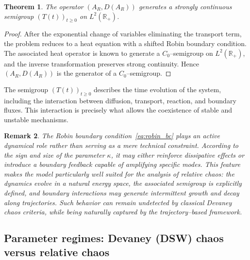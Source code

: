 \documentclass[12pt]{article}
\newtheorem{theorem}{Theorem}[section]
\newtheorem{remark}[theorem]{Remark}
\begin{document}
\begin{theorem}\label{thm:AR_generation}
The operator $(A_R,D(A_R))$ generates a strongly continuous semigroup $(T(t))_{t\ge 0}$ on $L^2(\mathbb{R}_+)$.
\end{theorem}

\begin{proof}
After the exponential change of variables eliminating the transport term, the problem reduces to a heat equation with a shifted Robin boundary condition. The associated heat operator is known to generate a $C_0$--semigroup on $L^2(\mathbb{R}_+)$, and the inverse transformation preserves strong continuity. Hence $(A_R,D(A_R))$ is the generator of a $C_0$--semigroup.
\end{proof}

The semigroup $(T(t))_{t\ge 0}$ describes the time evolution of the system, including the interaction between diffusion, transport, reaction, and boundary fluxes. This interaction is precisely what allows the coexistence of stable and unstable mechanisms.

\begin{remark}
The Robin boundary condition~\eqref{eq:robin_bc} plays an active dynamical role rather than serving as a mere technical constraint. According to the sign and size of the parameter $\kappa$, it may either reinforce dissipative effects or introduce a boundary feedback capable of amplifying specific modes. This feature makes the model particularly well suited for the analysis of relative chaos: the dynamics evolve in a natural energy space, the associated semigroup is explicitly defined, and boundary interactions may generate intermittent growth and decay along trajectories. Such behavior can remain undetected by classical Devaney chaos criteria, while being naturally captured by the trajectory--based framework.
\end{remark}

\subsection{Parameter regimes: Devaney (DSW) chaos versus relative chaos}
\end{document}
